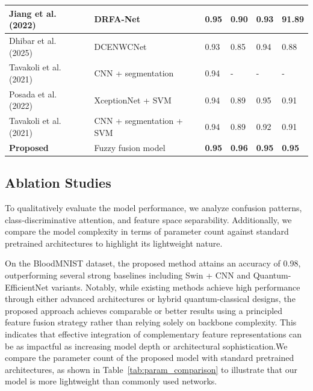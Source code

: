 \documentclass[12pt]{article}
\begin{document}
\begin{table}[!t]
{\begin{tabular}{|p{3.5cm}|p{4.1cm}|p{1.5cm}|p{1.5cm}|p{1.5cm}|p{1.5cm}|}
Jiang et al. (2022)~\cite{b40} & DRFA-Net & 0.95 & 0.90 & 0.93 & 91.89 \\ \hline
Dhibar et al. (2025)~\cite{b41} & DCENWCNet & 0.93 & 0.85 & 0.94 & 0.88 \\ \hline
Tavakoli et al. (2021)~\cite{b42} & CNN + segmentation & 0.94 & - & - & - \\ \hline
Posada et al. (2022)~\cite{b43} & XceptionNet + SVM & 0.94 & 0.89 & 0.95 & 0.91 \\ \hline
Tavakoli et al. (2021)~\cite{b44} & CNN + segmentation + SVM & 0.94 & 0.89 & 0.92 & 0.91 \\ \hline


\textbf{Proposed} & Fuzzy fusion model & \textbf{0.95} & \textbf{0.96} & \textbf{0.95} & \textbf{0.95} \\ \hline

\end{tabular}
}
\end{table}

\FloatBarrier
\subsection{Ablation Studies}
To qualitatively evaluate the model performance, we analyze confusion patterns, class-discriminative attention, and feature space separability. Additionally, we compare the model complexity in terms of parameter count against standard pretrained architectures to highlight its lightweight nature.


\FloatBarrier
On the BloodMNIST dataset, the proposed method attains an accuracy of 0.98, outperforming several strong baselines including Swin + CNN and Quantum-EfficientNet variants. Notably, while existing methods achieve high performance through either advanced architectures or hybrid quantum-classical designs, the proposed approach achieves comparable or better results using a principled feature fusion strategy rather than relying solely on backbone complexity. This indicates that effective integration of complementary feature representations can be as impactful as increasing model depth or architectural sophistication.We compare the parameter count of the proposed model with standard pretrained architectures, as shown in Table~\ref{tab:param_comparison} to illustrate that our model is more lightweight than commonly used networks.
\end{document}
